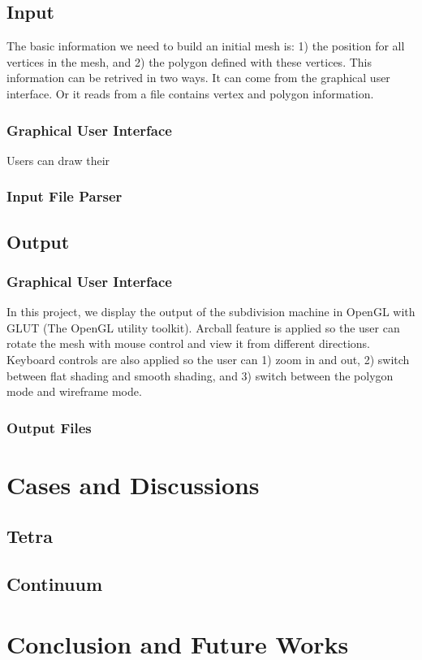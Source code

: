 \documentclass[12pt]{article}
\begin{document}
\subsection{Input}
The basic information we need to build an initial mesh is: 1) the position for all vertices in the mesh, and 2) the polygon defined with these vertices.
This information can be retrived in two ways. It can come from the graphical user interface. Or it reads from a file contains vertex and polygon information.
\subsubsection{Graphical User Interface}
Users can draw their 
\subsubsection{Input File Parser}

\subsection{Output}
\subsubsection{Graphical User Interface}
In this project, we display the output of the subdivision machine in OpenGL with GLUT (The OpenGL utility toolkit). 
Arcball feature is applied so the user can rotate the mesh with mouse control and view it from different directions. 
Keyboard controls are also applied so the user can 1) zoom in and out, 2) switch between flat shading and smooth shading, and 3) switch between the polygon mode and wireframe mode.
\subsubsection{Output Files}

\section{Cases and Discussions}
\subsection{Tetra}
\subsection{Continuum}

\section{Conclusion and Future Works}
\end{document}
